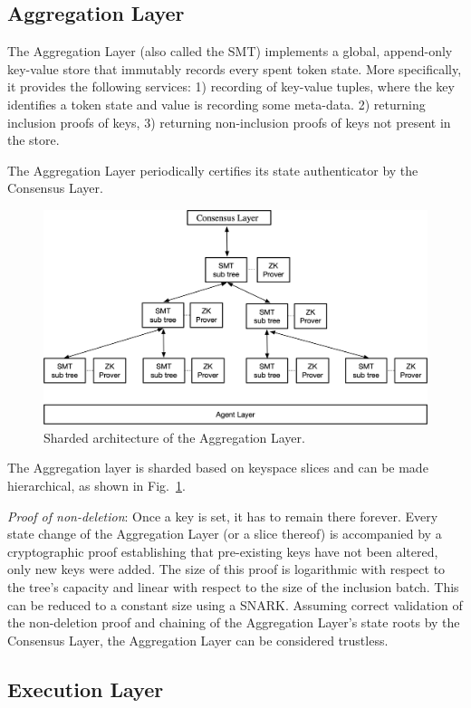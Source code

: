\documentclass[twocolumn]{article}
\begin{document}
\subsection{Aggregation Layer}

The Aggregation Layer (also called the SMT) implements a global, append-only key-value store that immutably records every spent token state. More specifically, it provides the following services: 1) recording of key-value tuples, where the key identifies a token state and value is recording some meta-data. 2) returning inclusion proofs of keys, 3) returning non-inclusion proofs of keys not present in the store.

The Aggregation Layer periodically certifies its state authenticator by the Consensus Layer.

\begin{figure}[!t]
    \centering
    \includegraphics[width=.7\textwidth]{pic/layers}
    \caption{Sharded architecture of the Aggregation Layer.}\label{fig:sharding}
\end{figure}

The Aggregation layer is sharded based on keyspace slices and can be made hierarchical, as shown in Fig.~\ref{fig:sharding}.

\emph{Proof of non-deletion}: Once a key is set, it has to remain there forever. Every state change of the Aggregation Layer (or a slice thereof) is accompanied by a cryptographic proof establishing that pre-existing keys have not been altered, only new keys were added. The size of this proof is logarithmic with respect to the tree's capacity and linear with respect to the size of the inclusion batch. This can be reduced to a constant size using a SNARK. Assuming correct validation of the non-deletion proof and chaining of the Aggregation Layer's state roots by the Consensus Layer, the Aggregation Layer can be considered trustless.


\subsection{Execution Layer}
\end{document}
